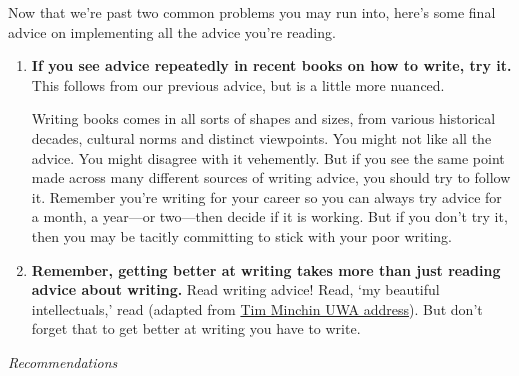 \documentclass[11pt,letter]{article}
\begin{document}
Now that we're past two common problems you may run into, here's some final advice on implementing all the advice you're reading.
\begin{enumerate}
\item {\bf If you see advice repeatedly in recent books on how to write, try it.} This follows from our previous advice, but is a little more nuanced. 

Writing books comes in all sorts of shapes and sizes, from various historical decades, cultural norms and distinct viewpoints. You might not like all the advice. You might disagree with it vehemently. But if you see the same point made across many different sources of writing advice, you should try to follow it. Remember you're writing for your career so you can always try advice for a month, a year---or two---then decide if it is working. But if you don't try it, then you may be tacitly committing to stick with your poor writing. 
\item {\bf Remember, getting better at writing takes more than just reading advice about writing.} Read writing advice! Read,  `my beautiful intellectuals,' read (adapted from \href{https://www.youtube.com/watch?v=yoEezZD71sc}{Tim Minchin UWA address}).  But don't forget that to get better at writing you have to write. %
\end{enumerate}


\emph{Recommendations}
\end{document}
